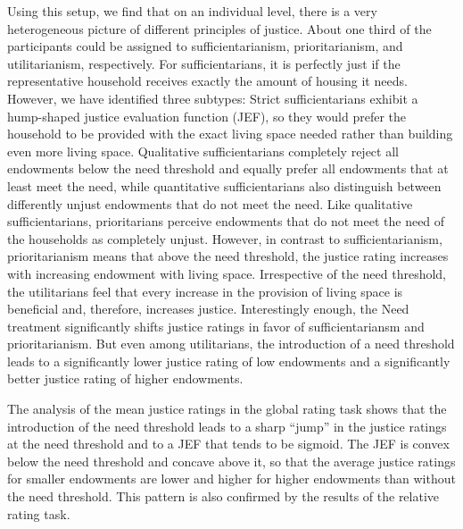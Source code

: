 \documentclass[12pt]{scrartcl}
\begin{document}
Using this setup, we find that on an individual level, there is a very heterogeneous picture of different principles of justice.
About one third of the participants could be assigned to sufficientarianism, prioritarianism, and utilitarianism, respectively.
For sufficientarians, it is perfectly just if the representative household receives exactly the amount of housing it needs.
However, we have identified three subtypes: Strict sufficientarians exhibit a hump-shaped justice evaluation function (JEF), so they would prefer the household to be provided with the exact living space needed rather than building even more living space.
Qualitative sufficientarians completely reject all endowments below the need threshold and equally prefer all endowments that at least meet the need, while quantitative sufficientarians also distinguish between differently unjust endowments that do not meet the need.
Like qualitative sufficientarians, prioritarians perceive endowments that do not meet the need of the households as completely unjust.
However, in contrast to sufficientarianism, prioritarianism means that above the need threshold, the justice rating increases with increasing endowment with living space.
Irrespective of the need threshold, the utilitarians feel that every increase in the provision of living space is beneficial and, therefore, increases justice.
Interestingly enough, the Need treatment significantly shifts justice ratings in favor of sufficientariansm and prioritarianism.
But even among utilitarians, the introduction of a need threshold leads to a significantly lower justice rating of low endowments and a significantly better justice rating of higher endowments.

The analysis of the mean justice ratings in the global rating task shows that the introduction of the need threshold leads to a sharp ``jump'' in the justice ratings at the need threshold and to a JEF that tends to be sigmoid.
The JEF is convex below the need threshold and concave above it, so that the average justice ratings for smaller endowments are lower and higher for higher endowments than without the need threshold.
This pattern is also confirmed by the results of the relative rating task.
\end{document}
